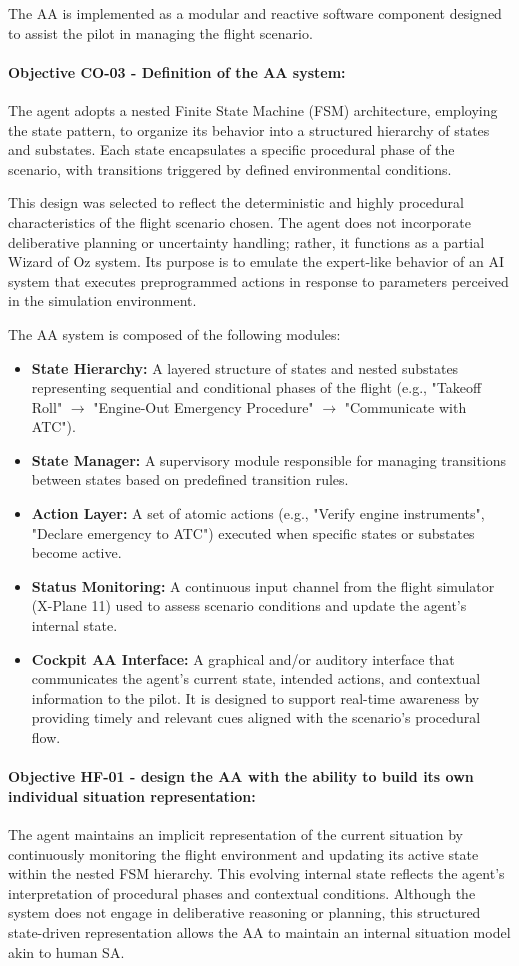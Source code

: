 \documentclass[12pt,a4paper]{article} %
\begin{document}
	The AA is implemented as a modular and reactive software component designed to assist the pilot in managing the flight scenario.
	\paragraph{Objective CO-03 - Definition of the AA system:} The agent adopts a nested Finite State Machine (FSM) architecture, employing the state pattern, to organize its behavior into a structured hierarchy of states and substates. Each state encapsulates a specific procedural phase of the scenario, with transitions triggered by defined environmental conditions.
	
	This design was selected to reflect the deterministic and highly procedural characteristics of the flight scenario chosen. The agent does not incorporate deliberative planning or uncertainty handling; rather, it functions as a partial Wizard of Oz system. Its purpose is to emulate the expert-like behavior of an AI system that executes preprogrammed actions in response to parameters perceived in the simulation environment.
	
	The AA system is composed of the following modules: 
	\begin{itemize} 
		\item \textbf{State Hierarchy:} A layered structure of states and nested substates representing sequential and conditional phases of the flight (e.g., "Takeoff Roll" $\rightarrow$ "Engine-Out Emergency Procedure" $\rightarrow$ "Communicate with ATC").
		\item \textbf{State Manager:} A supervisory module responsible for managing transitions between states based on predefined transition rules.
		\item \textbf{Action Layer:} A set of atomic actions (e.g., "Verify engine instruments", "Declare emergency to ATC") executed when specific states or substates become active.
		\item \textbf{Status Monitoring:} A continuous input channel from the flight simulator (X-Plane 11) used to assess scenario conditions and update the agent's internal state. 
		\item \textbf{Cockpit AA Interface:} A graphical and/or auditory interface that communicates the agent's current state, intended actions, and contextual information to the pilot. It is designed to support real-time awareness by providing timely and relevant cues aligned with the scenario's procedural flow.
	\end{itemize}
	\paragraph{Objective HF-01 - design the AA with the ability to build its own individual situation representation:}
	The agent maintains an implicit representation of the current situation by continuously monitoring the flight environment and updating its active state within the nested FSM hierarchy. This evolving internal state reflects the agent's interpretation of procedural phases and contextual conditions. Although the system does not engage in deliberative reasoning or planning, this structured state-driven representation allows the AA to maintain an internal situation model akin to human SA.
\end{document}

